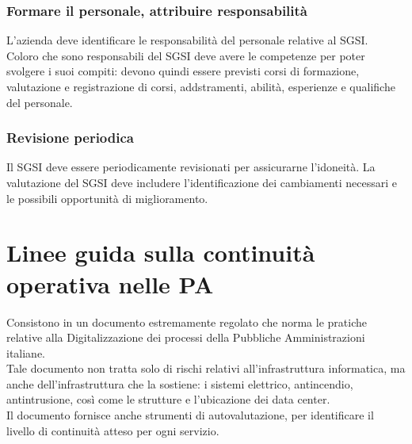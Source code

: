 \subsubsection{Formare il personale, attribuire responsabilit\`a}
L'azienda deve identificare le responsabilit\`a del personale relative al SGSI.\\
Coloro che sono responsabili del SGSI deve avere le competenze per poter svolgere i suoi compiti: devono quindi essere previsti corsi di formazione, valutazione e registrazione di corsi, addstramenti, abilit\`a, esperienze e qualifiche del personale.
\subsubsection{Revisione periodica}
Il SGSI deve essere periodicamente revisionati per assicurarne l'idoneit\`a. La valutazione del SGSI deve includere l'identificazione dei cambiamenti necessari e le possibili opportunit\`a di miglioramento.
\section{Linee guida sulla continuit\`a operativa nelle PA}
Consistono in un documento estremamente regolato che norma le pratiche relative alla Digitalizzazione dei processi della Pubbliche Amministrazioni italiane.\\
Tale documento non tratta solo di rischi relativi all’infrastruttura informatica, ma anche dell’infrastruttura che la sostiene: i sistemi elettrico, antincendio, antintrusione, cos\`i come le strutture e l'ubicazione dei data center.\\
Il documento fornisce anche strumenti di autovalutazione, per identificare il livello di continuit\`a atteso per ogni servizio.
